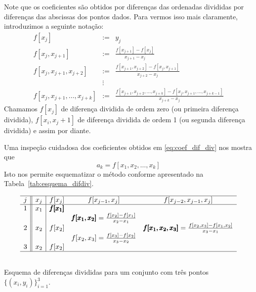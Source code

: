 Note que os coeficientes são obtidos por diferenças das ordenadas divididas por diferenças das abscissas dos pontos dados. Para vermos isso mais claramente, introduzimos a seguinte notação:
\begin{eqnarray*}
f[x_j]&:=&y_j\\
f[x_j, x_{j+1}]&:=&\frac{f[x_{j+1}]-f[x_j]}{x_{j+1}-x_j}\\
f[x_j, x_{j+1}, x_{j+2}]&:=&\frac{f[x_{j+1}, x_{j+2}]-f[x_j, x_{j+1}]}{x_{j+2}-x_j}\\
&\vdots&\\
f[x_j, x_{j+1}, \dotsc, x_{j+k}] &:=& \frac{f[x_{j+1}, x_{j+2}, \dotsc, x_{j+k}]-f[x_j, x_{j+1}, \dotsc, x_{j+k-1}]}{x_{j+k}-x_j}
\end{eqnarray*}
Chamamos $f[x_j]$ de diferença dividida de ordem zero (ou primeira diferença dividida), $f[x_i,x_j+1]$ de diferença dividida de ordem 1 (ou segunda diferença dividida) e assim por diante.

Uma inspeção cuidadosa dos coeficientes obtidos em \eqref{eq:coef_dif_div} nos mostra que
\begin{equation*}
 a_k=f[x_1,x_2,\ldots,x_k] 
\end{equation*}
Isto nos permite esquematizar o método conforme apresentado na Tabela~\ref{tab:esquema_difdiv}. 

\begin{table}
  \centering
$$
\begin{array}{c||c|ccc}\hline
j &x_j&f[x_j]&f[x_{j-1},x_j]&f[x_{j-2},x_{j-1},x_j]\\\hline
1 & x_1 & \pmb{f[x_1]}&&\\
&&&\pmb{f[x_1,x_2]}=\frac{f[x_2]-f[x_1]}{x_2-x_1}&\\
2 & x_2&f[x_2]&&\pmb{f[x_1,x_2,x_3]}=\frac{f[x_2,x_3]-f[x_1,x_2]}{x_3-x_1}\\
&&&f[x_2,x_3]=\frac{f[x_3]-f[x_2]}{x_3-x_2}&\\
3 & x_2&f[x_2]&&\\\hline
\multicolumn{5}{c}{}
\end{array}
$$
  \caption{Esquema de diferenças divididas para um conjunto com três pontos $\{(x_i, y_i)\}_{i=1}^3$.}
  \label{tab:esquema_difdiv}
\end{table}

